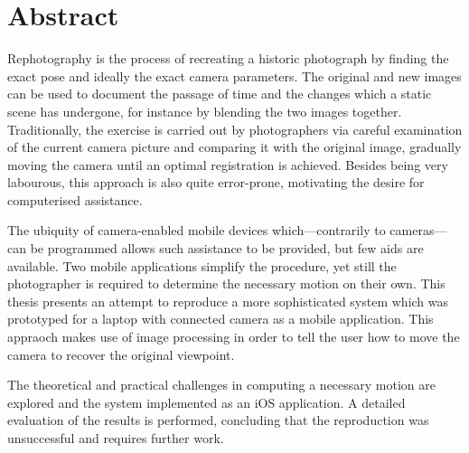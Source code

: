 \chapter*{Abstract}

Rephotography is the process of recreating a historic photograph by finding the
exact pose and ideally the exact camera parameters. The original and new images
can be used to document the passage of time and the changes which a static scene
has undergone, for instance by blending the two images together. Traditionally,
the exercise is carried out by photographers via careful examination of the
current camera picture and comparing it with the original image, gradually
moving the camera until an optimal registration is achieved. Besides being very
labourous, this approach is also quite error-prone, motivating the desire for
computerised assistance.

The ubiquity of camera-enabled mobile devices which---contrarily to
cameras---can be programmed allows such assistance to be provided, but few aids
are available. Two mobile applications simplify the procedure, yet still the
photographer is required to determine the necessary motion on their own. This
thesis presents an attempt to reproduce a more sophisticated system which was
prototyped for a laptop with connected camera as a mobile application. This
appraoch makes use of image processing in order to tell the user how to move the
camera to recover the original viewpoint.

The theoretical and practical challenges in computing a necessary motion are
explored and the system implemented as an iOS application. A detailed
evaluation of the results is performed, concluding that the reproduction was
unsuccessful and requires further work.
